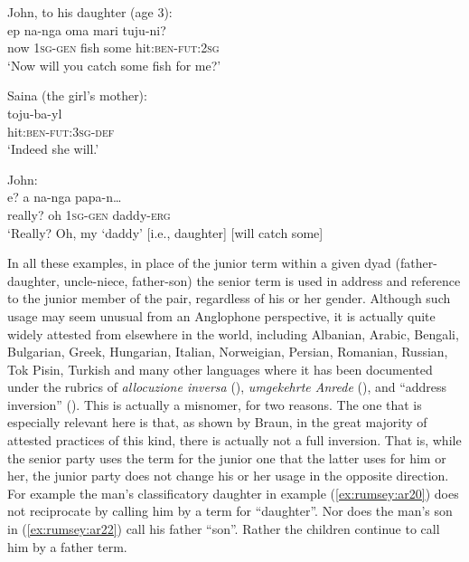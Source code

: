 \documentclass[output=paper]{langsci/langscibook}
\begin{document}
\begin{exe}
	\ex \label{ex:rumsey:ar23}
	\begin{xlist}
	\ex John, to his daughter (age 3):\label{ex:rumsey:ar23a}\\
	\gll ep na-nga oma mari tuju-ni?\\
	now 1\textsc{sg}-\textsc{gen} fish some hit:\textsc{ben}-\textsc{fut}:2\textsc{sg}\\
	\trans ‘Now will you catch some fish for me?’ 	
	
	\ex Saina (the girl’s mother):\label{ex:rumsey:ar23b}\\
	\gll toju-ba-yl\\
	hit:\textsc{ben}-\textsc{fut}:3\textsc{sg}-\textsc{def}\\
	\trans ‘Indeed she will.’
	
	\ex John:\label{ex:rumsey:ar23c}\\
	\gll e? a na-nga papa-n…\\
	really? oh 1\textsc{sg}-\textsc{gen} daddy-\textsc{erg}\\
	\trans ‘Really? Oh, my ‘daddy’ [i.e., daughter] [will catch some]
	\end{xlist}
\end{exe}

In all these examples, in place of the junior term within a given dyad (father-daughter, uncle-niece, father-son) the senior term is used in address and reference to the junior member of the pair, regardless of his or her gender. Although such usage may seem unusual from an Anglophone perspective, it is actually quite widely attested from elsewhere in the world, including Albanian, Arabic, Bengali, Bulgarian, Greek, Hungarian, Italian, Norweigian, Persian, Romanian, Russian, Tok Pisin, Turkish and many other languages where it has been documented under the rubrics of \textit{allocuzione inversa} (\citealt{Renzi1968}), \textit{umgekehrte Anrede} (\citealt{BeyerKostov1978}), and “address inversion” (\citealt{Braun1988}).  This is actually a misnomer, for two reasons.  The one that is especially relevant here is that, as shown by Braun, in the great majority of attested practices of this kind, there is actually not a full inversion. That is, while the senior party uses the term for the junior one that the latter uses for him or her, the junior party does not change his or her usage in the opposite direction. For example the man’s classificatory daughter in example (\ref{ex:rumsey:ar20}) does not reciprocate by calling him by a term for “daughter”. Nor does the man’s son in (\ref{ex:rumsey:ar22}) call his father “son”. Rather the children continue to call him by a father term. 
\end{document}
